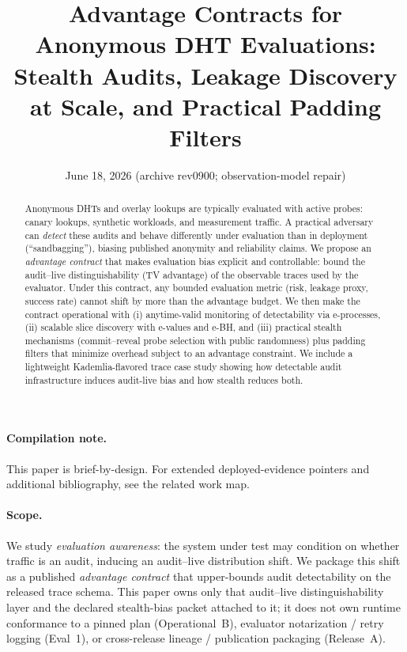 \documentclass[11pt]{article}
\title{Advantage Contracts for Anonymous DHT Evaluations:\\
Stealth Audits, Leakage Discovery at Scale, and Practical Padding Filters}
\author{}
\date{June 18, 2026 (archive rev0900; observation-model repair)}
\begin{document}
\maketitle

\begin{abstract}
Anonymous DHTs and overlay lookups are typically evaluated with active probes: canary lookups, synthetic workloads, and measurement traffic.
A practical adversary can \emph{detect} these audits and behave differently under evaluation than in deployment (``sandbagging''),
biasing published anonymity and reliability claims.
We propose an \emph{advantage contract} that makes evaluation bias explicit and controllable:
bound the audit--live distinguishability (TV advantage) of the observable traces used by the evaluator.
Under this contract, any bounded evaluation metric (risk, leakage proxy, success rate) cannot shift by more than the advantage budget.
We then make the contract operational with (i) anytime-valid monitoring of detectability via e-processes, (ii) scalable slice discovery with e-values and e-BH,
and (iii) practical stealth mechanisms (commit--reveal probe selection with public randomness) plus padding filters that minimize overhead subject to an advantage constraint.
We include a lightweight Kademlia-flavored trace case study showing how detectable audit infrastructure induces audit-live bias and how stealth reduces both.
\end{abstract}

\paragraph{Compilation note.}
This paper is brief-by-design. For extended deployed-evidence pointers and additional bibliography, see the related work map.\cite{series:relatedwork}

\paragraph{Scope.}
We study \emph{evaluation awareness}: the system under test may condition on whether traffic is an audit, inducing an audit--live distribution shift.
We package this shift as a published \emph{advantage contract} that upper-bounds audit detectability on the released trace schema.
This paper owns only that audit--live distinguishability layer and the declared stealth-bias packet attached to it; it does not own runtime conformance to a pinned plan (Operational~B), evaluator notarization / retry logging (Eval~1), or cross-release lineage / publication packaging (Release~A).
\end{document}
